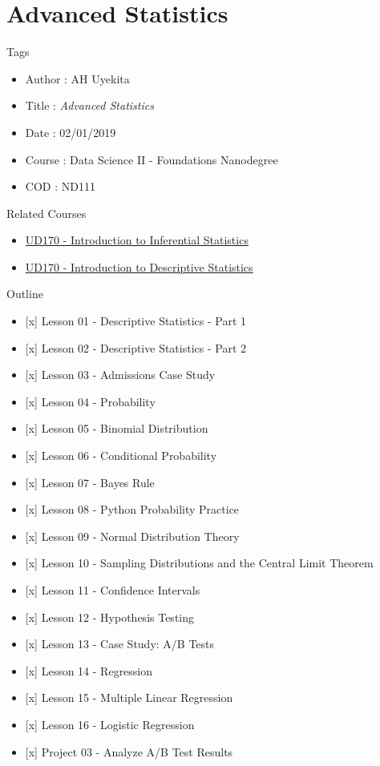 \documentclass[]{book}
\providecommand{\tightlist}{%
  \setlength{\itemsep}{0pt}\setlength{\parskip}{0pt}}
\begin{document}
\chapter{Advanced Statistics}\label{advanced-statistics}

Tags

\begin{itemize}
\tightlist
\item
  Author : AH Uyekita
\item
  Title : \emph{Advanced Statistics}
\item
  Date : 02/01/2019
\item
  Course : Data Science II - Foundations Nanodegree
\item
  COD : ND111
\end{itemize}

Related Courses

\begin{itemize}
\tightlist
\item
  \href{https://classroom.udacity.com/courses/ud201}{UD170 -
  Introduction to Inferential Statistics}
\item
  \href{https://classroom.udacity.com/courses/ud827}{UD170 -
  Introduction to Descriptive Statistics}
\end{itemize}

Outline

\begin{itemize}
\tightlist
\item
  {[}x{]} Lesson 01 - Descriptive Statistics - Part 1
\item
  {[}x{]} Lesson 02 - Descriptive Statistics - Part 2
\item
  {[}x{]} Lesson 03 - Admissions Case Study
\item
  {[}x{]} Lesson 04 - Probability
\item
  {[}x{]} Lesson 05 - Binomial Distribution
\item
  {[}x{]} Lesson 06 - Conditional Probability
\item
  {[}x{]} Lesson 07 - Bayes Rule
\item
  {[}x{]} Lesson 08 - Python Probability Practice
\item
  {[}x{]} Lesson 09 - Normal Distribution Theory
\item
  {[}x{]} Lesson 10 - Sampling Distributions and the Central Limit
  Theorem
\item
  {[}x{]} Lesson 11 - Confidence Intervals
\item
  {[}x{]} Lesson 12 - Hypothesis Testing
\item
  {[}x{]} Lesson 13 - Case Study: A/B Tests
\item
  {[}x{]} Lesson 14 - Regression
\item
  {[}x{]} Lesson 15 - Multiple Linear Regression
\item
  {[}x{]} Lesson 16 - Logistic Regression
\item
  {[}x{]} Project 03 - Analyze A/B Test Results
\end{itemize}
\end{document}
